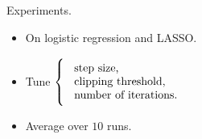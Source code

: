 \documentclass{beamer}
\begin{document}
\begin{frame}
  \begin{center}
    \Huge Experiments.
  \end{center}

  \begin{itemize}[itemsep=0.5em]
  \item On logistic regression and LASSO.

  \item Tune
    $\left\{\rule{0cm}{2.5em}\right.
      \begin{tabular}{l}
        step size, \\
        clipping threshold,\\
        number of iterations.
      \end{tabular}
      $

    \item Average over $10$ runs.

  \end{itemize}
\end{frame}
\end{document}
